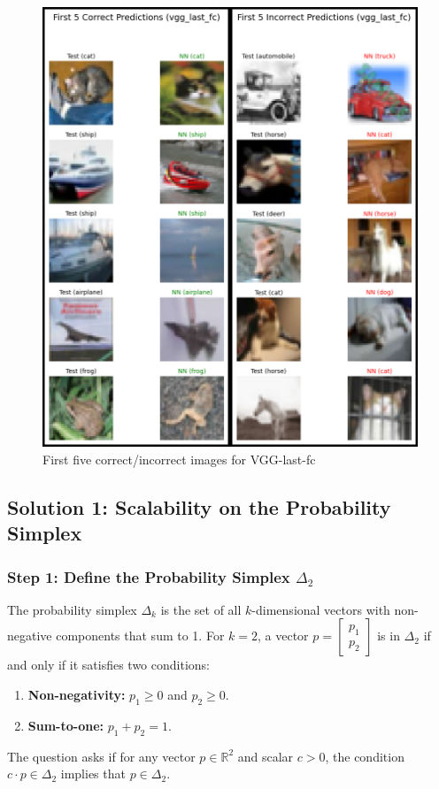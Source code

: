 \documentclass{article}
\begin{document}
\begin{figure}[h]
  \includegraphics[height=0.75\textheight,width=\textwidth]{vgg_last_fc.png}
  \caption{First five correct/incorrect images for VGG-last-fc}
\end{figure}

\newpage

\subsection*{Solution 1: Scalability on the Probability Simplex}

\subsubsection*{Step 1: Define the Probability Simplex $\Delta_2$}
\parbox{\textwidth}{
  The probability simplex $\Delta_k$ is the set of all $k$-dimensional vectors with non-negative components that sum to 1. For $k=2$, a vector $p = \begin{bmatrix} p_1 \\ p_2 \end{bmatrix}$ is in $\Delta_2$ if and only if it satisfies two conditions:
\begin{enumerate}
    \item \textbf{Non-negativity:} $p_1 \geq 0$ and $p_2 \geq 0$.
    \item \textbf{Sum-to-one:} $p_1 + p_2 = 1$.
\end{enumerate}
The question asks if for any vector $p \in \mathbb{R}^2$ and scalar $c > 0$, the condition $c \cdot p \in \Delta_2$ implies that $p \in \Delta_2$.}
\end{document}
